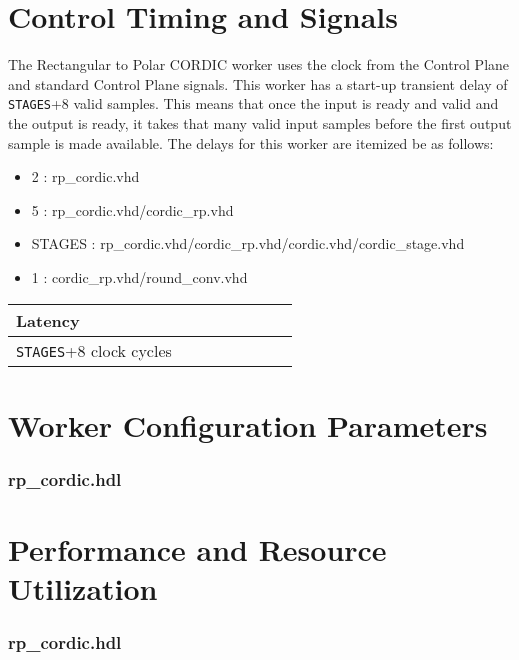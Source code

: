 \documentclass{article}
\def\comp{rp\_cordic}
\edef\ecomp{rp_cordic}
\begin{document}
\section*{Control Timing and Signals}
The Rectangular to Polar CORDIC worker uses the clock from the Control Plane and standard Control Plane signals. This worker has a start-up transient delay of \verb+STAGES++8 valid samples. This means that once the input is ready and valid and the output is ready, it takes that many valid input samples before the first output sample is made available. The delays for this worker are itemized be as follows:
\begin{itemize}
	\item 2 : rp\_cordic.vhd
	\item 5 : rp\_cordic.vhd/cordic\_rp.vhd
	\item STAGES : rp\_cordic.vhd/cordic\_rp.vhd/cordic.vhd/cordic\_stage.vhd 
	\item 1 : cordic\_rp.vhd/round\_conv.vhd
\end{itemize}

\begin{tabular}{|M{4.5cm}|M{1cm}|M{1cm}|M{1.5cm}|M{2cm}|M{1cm}|M{1cm}|M{2.5cm}|}
	\hline
	Latency                      \\
	\hline
	\verb+STAGES++8 clock cycles \\
	\hline
\end{tabular}

\begin{landscape}
\section*{Worker Configuration Parameters}
\subsubsection*{\comp.hdl}

\section*{Performance and Resource Utilization}
\subsubsection*{\comp.hdl}

\end{landscape}
\end{document}
